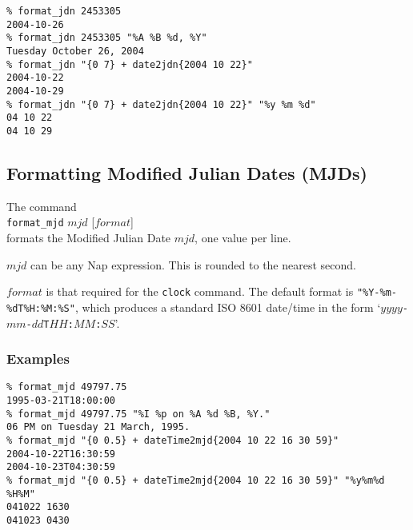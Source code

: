   \begin{verbatim}
% format_jdn 2453305
2004-10-26
% format_jdn 2453305 "%A %B %d, %Y"
Tuesday October 26, 2004
% format_jdn "{0 7} + date2jdn{2004 10 22}"
2004-10-22
2004-10-29
% format_jdn "{0 7} + date2jdn{2004 10 22}" "%y %m %d"
04 10 22
04 10 29
\end{verbatim}

\subsection{Formatting Modified Julian Dates (MJDs)}
    \label{date-proc-format-mjd}

The command
  \\
  \texttt{format\_mjd} $\mathit{mjd}$ [$\mathit{format}$]
  \\formats the Modified Julian Date 
  $\mathit{mjd}$, one value per line.
  


  $\mathit{mjd}$ can be any Nap expression. This is rounded to the
  nearest second.
  


  $\mathit{format}$ is that required for the 
  \texttt{clock} command. The default format is 
  \texttt{"\%Y-\%m-\%dT\%H:\%M:\%S"}, which produces a standard
  ISO 8601 date/time in the form
`\texttt{$\mathit{yyyy}$-$\mathit{mm}$-$\mathit{dd}$T$\mathit{HH}$:$\mathit{MM}$:$\mathit{SS}$}'.

\subsubsection{Examples}

  \begin{verbatim}
% format_mjd 49797.75
1995-03-21T18:00:00
% format_mjd 49797.75 "%I %p on %A %d %B, %Y."
06 PM on Tuesday 21 March, 1995.
% format_mjd "{0 0.5} + dateTime2mjd{2004 10 22 16 30 59}"
2004-10-22T16:30:59
2004-10-23T04:30:59
% format_mjd "{0 0.5} + dateTime2mjd{2004 10 22 16 30 59}" "%y%m%d %H%M"
041022 1630
041023 0430
\end{verbatim}

